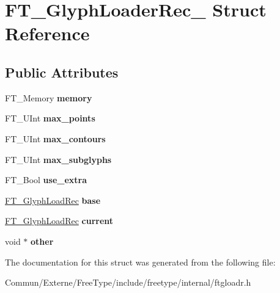 \hypertarget{struct_f_t___glyph_loader_rec__}{}\section{F\+T\+\_\+\+Glyph\+Loader\+Rec\+\_\+ Struct Reference}
\label{struct_f_t___glyph_loader_rec__}
\subsection*{Public Attributes}
\begin{DoxyCompactItemize}
\item 
F\+T\+\_\+\+Memory {\bfseries memory}\hypertarget{struct_f_t___glyph_loader_rec___a9120a7808ee59d24dd52409e609907a2}{}\label{struct_f_t___glyph_loader_rec___a9120a7808ee59d24dd52409e609907a2}

\item 
F\+T\+\_\+\+U\+Int {\bfseries max\+\_\+points}\hypertarget{struct_f_t___glyph_loader_rec___a62339fa7a06e0b4ddecd5db2aa606741}{}\label{struct_f_t___glyph_loader_rec___a62339fa7a06e0b4ddecd5db2aa606741}

\item 
F\+T\+\_\+\+U\+Int {\bfseries max\+\_\+contours}\hypertarget{struct_f_t___glyph_loader_rec___a808ccf46597572d953f387e705f10a36}{}\label{struct_f_t___glyph_loader_rec___a808ccf46597572d953f387e705f10a36}

\item 
F\+T\+\_\+\+U\+Int {\bfseries max\+\_\+subglyphs}\hypertarget{struct_f_t___glyph_loader_rec___a2d5b00d7caf624ed2b4f6fd2db3228db}{}\label{struct_f_t___glyph_loader_rec___a2d5b00d7caf624ed2b4f6fd2db3228db}

\item 
F\+T\+\_\+\+Bool {\bfseries use\+\_\+extra}\hypertarget{struct_f_t___glyph_loader_rec___a54009985acda32d83f2f124e28c5d00a}{}\label{struct_f_t___glyph_loader_rec___a54009985acda32d83f2f124e28c5d00a}

\item 
\hyperlink{struct_f_t___glyph_load_rec__}{F\+T\+\_\+\+Glyph\+Load\+Rec} {\bfseries base}\hypertarget{struct_f_t___glyph_loader_rec___ae80dfc17f20bfce8c60ffaaba95c821b}{}\label{struct_f_t___glyph_loader_rec___ae80dfc17f20bfce8c60ffaaba95c821b}

\item 
\hyperlink{struct_f_t___glyph_load_rec__}{F\+T\+\_\+\+Glyph\+Load\+Rec} {\bfseries current}\hypertarget{struct_f_t___glyph_loader_rec___a271b1b9604746ed08cf6613710ebb4c1}{}\label{struct_f_t___glyph_loader_rec___a271b1b9604746ed08cf6613710ebb4c1}

\item 
void $\ast$ {\bfseries other}\hypertarget{struct_f_t___glyph_loader_rec___a9c58c5b06f0135fe5cef16bd85d939e3}{}\label{struct_f_t___glyph_loader_rec___a9c58c5b06f0135fe5cef16bd85d939e3}

\end{DoxyCompactItemize}


The documentation for this struct was generated from the following file\+:\begin{DoxyCompactItemize}
\item 
Commun/\+Externe/\+Free\+Type/include/freetype/internal/ftgloadr.\+h\end{DoxyCompactItemize}
